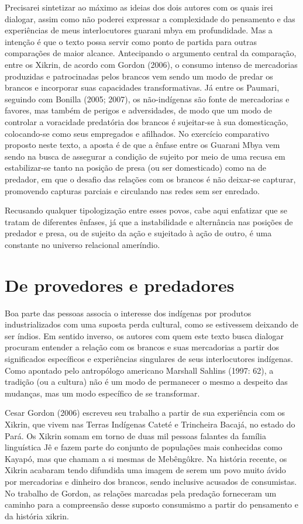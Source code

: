 Precisarei sintetizar ao máximo as ideias dos dois autores com os quais
irei dialogar, assim como não poderei expressar a complexidade do
pensamento e das experiências de meus interlocutores guarani mbya em
profundidade. Mas a intenção é que o texto possa servir como ponto de
partida para outras comparações de maior alcance. Antecipando o
argumento central da comparação, entre os Xikrin, de acordo com Gordon
(2006), o consumo intenso de mercadorias produzidas e patrocinadas
pelos brancos vem sendo um modo de predar os brancos e incorporar suas
capacidades transformativas. Já entre os Paumari, seguindo com Bonilla
(2005; 2007), os não-indígenas são fonte de mercadorias e favores, mas
também de perigos e adversidades, de modo que um modo de controlar a
voracidade predatória dos brancos é sujeitar-se à sua domesticação,
colocando-se como seus empregados e afilhados. No exercício comparativo
proposto neste texto, a aposta é de que a ênfase entre os Guarani Mbya
vem sendo na busca de assegurar a condição de sujeito por meio de uma
recusa em estabilizar-se tanto na posição de presa (ou ser domesticado)
como na de predador, em que o desafio das relações com os brancos é não
deixar-se capturar, promovendo capturas parciais e circulando nas redes
sem ser enredado. 

Recusando qualquer tipologização entre esses povos, cabe aqui enfatizar
que se tratam de diferentes ênfases, já que a instabilidade e
alternância nas posições de predador e presa, ou de sujeito da ação e
sujeitado à ação de outro, é uma constante no universo relacional
ameríndio. 

\section{De provedores e predadores} 

Boa parte das pessoas associa o interesse dos indígenas por produtos
industrializados com uma suposta perda cultural, como se estivessem
deixando de ser índios. Em sentido inverso, os autores com quem este
texto busca dialogar procuram entender a relação com os brancos e suas
mercadorias a partir dos significados específicos e experiências
singulares de seus interlocutores indígenas. Como apontado pelo
antropólogo americano Marshall Sahlins (1997: 62), a tradição (ou a
cultura) não é um modo de permanecer o mesmo a despeito das mudanças,
mas um modo específico de se transformar.

Cesar Gordon (2006) escreveu seu trabalho a partir de sua experiência
com os Xikrin, que vivem nas Terras Indígenas Cateté e Trincheira
Bacajá, no estado do Pará. Os Xikrin somam em torno de duas mil pessoas
falantes da família linguística Jê e fazem parte do conjunto de
populações mais conhecidas como Kayapó, mas que chamam a si mesmas de
Mebêngôkre. Na história recente, os Xikrin acabaram tendo difundida uma
imagem de serem um povo muito ávido por mercadorias e dinheiro dos
brancos, sendo inclusive acusados de consumistas. No trabalho de
Gordon, as relações marcadas pela predação forneceram um caminho para a
compreensão desse suposto consumismo a partir do pensamento e da
história xikrin.

